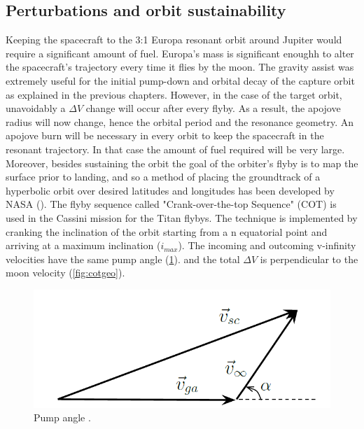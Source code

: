\subsection{Perturbations and orbit sustainability}
Keeping the spacecraft to the 3:1 Europa resonant orbit around Jupiter would require a significant amount of fuel. Europa's mass is significant enoughh to alter the spacecraft's trajectory every time it flies by the moon. The gravity assist was extremely useful for the initial pump-down and orbital decay of the capture orbit as explained in the previous chapters. However, in the case of the target orbit, unavoidably a $\Delta V$ change will occur after every flyby. As a result, the apojove radius will now change, hence the orbital period and the resonance geometry. An apojove burn will be necessary in every orbit to keep the spacecraft in the resonant trajectory. In that case the amount of fuel required will be very large. Moreover, besides sustaining the orbit the goal of the orbiter's flyby is to map the surface prior to landing, and so a method of placing the groundtrack of a hyperbolic orbit over desired latitudes and longitudes has been developed by NASA (\cite{cotseq}). 
The flyby sequence called "Crank-over-the-top Sequence" (COT) is used in the Cassini mission for the Titan flybys. The technique is implemented by cranking the inclination of the orbit starting from a n equatorial point and arriving at a maximum inclination ($i_{max}$). The incoming and outcoming v-infinity velocities have the same pump angle (\ref{fig:pump_a}).
and the total $\Delta V$ is perpendicular to the moon velocity (\ref{fig:cotgeo}). 

\begin{figure}[htb!]
\centering
\includegraphics[scale=0.6]{figures/Orbiter/pumpa.png}
\caption{Pump angle \cite{cotseq}.} 
\label{fig:pump_a}
\end{figure}

